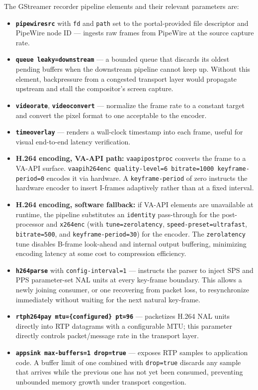 \label{sec:gstreamer_recorder}
The GStreamer recorder pipeline elements and their relevant parameters are:
\begin{itemize}
    \item \textbf{\texttt{pipewiresrc}} with \texttt{fd} and \texttt{path} set to the portal-provided file descriptor and PipeWire node ID --- ingests raw frames from PipeWire at the source capture rate.
    \item \textbf{\texttt{queue leaky=downstream}} --- a bounded queue that discards its oldest pending buffers when the downstream pipeline cannot keep up. Without this element, backpressure from a congested transport layer would propagate upstream and stall the compositor's screen capture.
    \item \textbf{\texttt{videorate}}, \textbf{\texttt{videoconvert}} --- normalize the frame rate to a constant target and convert the pixel format to one acceptable to the encoder.
    \item \textbf{\texttt{timeoverlay}} --- renders a wall-clock timestamp into each frame, useful for visual end-to-end latency verification.
    \item \textbf{H.264 encoding, VA-API path:} \texttt{vaapipostproc} converts the frame to a VA-API surface.
    \texttt{vaapih264enc quality-level=6 bitrate=1000 keyframe-period=0} encodes it via hardware.
    A \texttt{keyframe-period} of zero instructs the hardware encoder to insert I-frames adaptively rather than at a fixed interval.
    \item \textbf{H.264 encoding, software fallback:} if VA-API elements are unavailable at runtime, the pipeline substitutes an \texttt{identity} pass-through for the post-processor and \texttt{x264enc} (with \texttt{tune=zerolatency}, \texttt{speed-preset=ultrafast}, \texttt{bitrate=500}, and \texttt{keyframe-period=30}) for the encoder.
    The \texttt{zerolatency} tune disables B-frame look-ahead and internal output buffering, minimizing encoding latency at some cost to compression efficiency.
    \item \textbf{\texttt{h264parse}} with \texttt{config-interval=1} --- instructs the parser to inject SPS and PPS parameter-set NAL units at every key-frame boundary.
    This allows a newly joining consumer, or one recovering from packet loss, to resynchronize immediately without waiting for the next natural key-frame.
    \item \textbf{\texttt{rtph264pay mtu=\{configured\} pt=96}} --- packetizes H.264 NAL units directly into \ac{RTP} datagrams with a configurable \ac{MTU}; this parameter directly controls packet/message rate in the transport layer.
    \item \textbf{\texttt{appsink max-buffers=1 drop=true}} --- exposes \ac{RTP} samples to application code. A buffer limit of one combined with \texttt{drop=true} discards any sample that arrives while the previous one has not yet been consumed, preventing unbounded memory growth under transport congestion.
\end{itemize}

